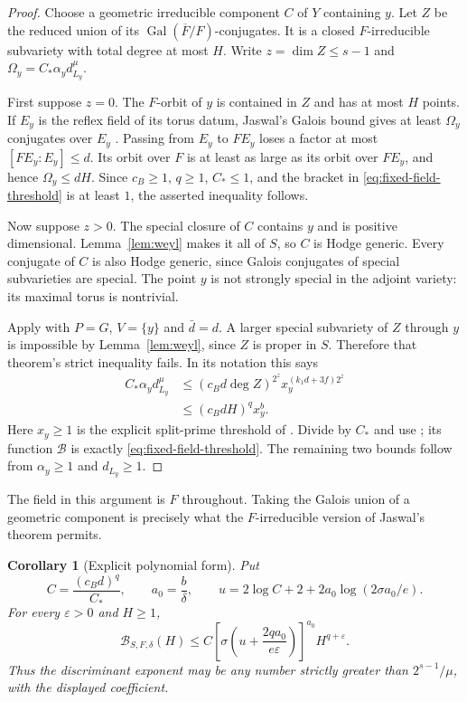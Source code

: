 \documentclass[11pt]{article}
\newtheorem{corollary}[theorem]{Corollary}
\theoremstyle{definition}
\theoremstyle{remark}
\begin{document}
\begin{proof}
Choose a geometric irreducible component $C$ of $Y$ containing $y$.
Let $Z$ be the reduced union of its
$\operatorname{Gal}(\overline F/F)$-conjugates.  It is a closed
$F$-irreducible subvariety with total degree at most $H$.  Write
$z=\dim Z\leq s-1$ and
$\Omega_y=C_*\alpha_y d_{L_y}^{\mu}$.

First suppose $z=0$.  The $F$-orbit of $y$ is contained in $Z$ and
has at most $H$ points.  If $E_y$ is the reflex field of its torus
datum, Jaswal's Galois bound gives at least $\Omega_y$ conjugates
over $E_y$ \cite[Corollary~3.4 and Lemma~6.4]{Jaswal}.
Passing from $E_y$ to $FE_y$ loses a factor at most
$[FE_y:E_y]\leq d$.  Its orbit over $F$ is at least as large as
its orbit over $FE_y$, and hence $\Omega_y\leq dH$.
Since $c_B\geq1$, $q\geq1$, $C_*\leq1$, and the bracket in
\eqref{eq:fixed-field-threshold} is at least $1$, the asserted
inequality follows.

Now suppose $z>0$.  The special closure of $C$ contains $y$ and is
positive dimensional.  Lemma~\ref{lem:weyl} makes it all
of $S$, so $C$ is Hodge generic.  Every conjugate of $C$ is also
Hodge generic, since Galois conjugates of special subvarieties are
special.  The point $y$ is not strongly special in the adjoint
variety: its maximal torus is nontrivial.

Apply \cite[Theorem~6.7]{Jaswal} with $P=G$, $V=\{y\}$ and
$\bar d=d$.  A larger special subvariety of $Z$ through $y$ is
impossible by Lemma~\ref{lem:weyl}, since $Z$ is proper
in $S$.  Therefore that theorem's strict inequality fails.  In its
notation this says
\begin{align*}
 C_*\alpha_y d_{L_y}^{\mu}
 &\leq (c_Bd\deg Z)^{2^z}
       x_y^{(k_1d+3f)2^z}\\
 &\leq (c_BdH)^q x_y^b.
\end{align*}
Here $x_y\geq1$ is the explicit split-prime threshold of
\cite[\S6.2]{Jaswal}.  Divide by $C_*$ and use
\cite[Lemma~6.8]{Jaswal}; its function $\mathcal B$ is exactly
\eqref{eq:fixed-field-threshold}.  The remaining two bounds follow
from $\alpha_y\geq1$ and $d_{L_y}\geq1$.
\end{proof}

The field in this argument is $F$ throughout.  Taking the Galois
union of a geometric component is precisely what the
$F$-irreducible version of Jaswal's theorem permits.

\begin{corollary}[Explicit polynomial form]\label{cor:pure-polynomial}
Put
\[
 C=\frac{(c_Bd)^q}{C_*},\qquad a_0=\frac b\delta,\qquad
 u=2\log C+2+2a_0\log(2\sigma a_0/e).
\]
For every $\varepsilon>0$ and $H\geq1$,
\[
 \mathcal B_{S,F,\delta}(H)
 \leq C\left[\sigma\left(u+\frac{2qa_0}{e\varepsilon}\right)\right]^{a_0}
 H^{q+\varepsilon}.
\]
Thus the discriminant exponent may be any number strictly greater
than $2^{s-1}/\mu$, with the displayed coefficient.
\end{corollary}
\end{document}
